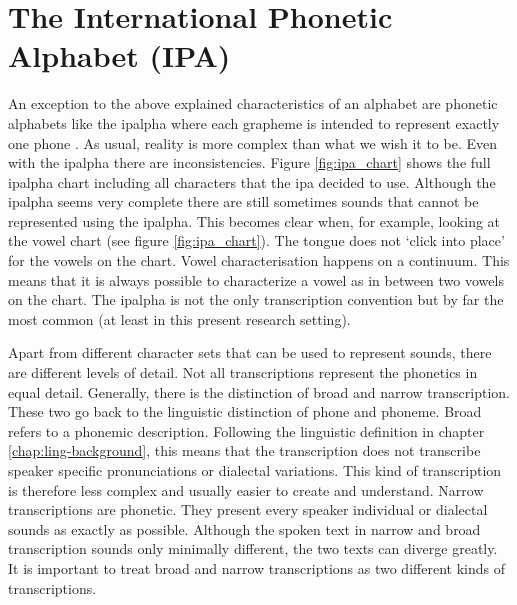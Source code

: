 \section{The International Phonetic Alphabet (IPA)}
\label{sec:ipa}
An exception to the above explained characteristics of an alphabet are phonetic alphabets like the \ac{ipalpha} where each grapheme is intended to represent exactly one phone  \citep{writing-systems, Intro.2007}. As usual, reality is more complex than what we wish it to be. Even with the \ac{ipalpha} there are inconsistencies. Figure \ref{fig:ipa_chart} shows the full \ac{ipalpha} chart including all characters that the \ac{ipa} decided to use. Although the \ac{ipalpha} seems very complete there are still sometimes sounds that cannot be represented using the \ac{ipalpha}. This becomes clear when, for example, looking at the vowel chart (see figure \ref{fig:ipa_chart}). The tongue does not `click into place' for the vowels on the chart. Vowel characterisation happens on a continuum. This means that it is always possible to characterize a vowel as in between two vowels on the chart. The \ac{ipalpha} is not the only transcription convention but by far the most common (at least in this present research setting). 

Apart from different character sets that can be used to represent sounds, there are different levels of detail. Not all transcriptions represent the phonetics in equal detail. Generally, there is the distinction of broad and narrow transcription. These two go back to the linguistic distinction of phone and phoneme. Broad refers to a phonemic description. Following the linguistic definition in chapter \ref{chap:ling-background}, this means that the transcription does not transcribe speaker specific pronunciations or dialectal variations. This kind of transcription is therefore less complex and usually easier to create and understand. Narrow transcriptions are phonetic. They present every speaker individual or dialectal sounds as exactly as possible. Although the spoken text in narrow and broad transcription sounds only minimally different, the two texts can diverge greatly. It is important to treat broad and narrow transcriptions as two different kinds of transcriptions. 

\begin{covexamples}
\item \label{exBro} 
\item \label{exNar}
\end{covexamples}

